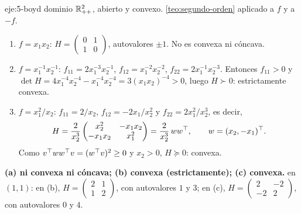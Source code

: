 \begin{solucion}{eje:5-boyd}
\datos dominio $\mathbb{R}^{2}_{++}$, abierto y convexo.
\planteamiento \cref{teo:segundo-orden} aplicado a $f$ y a $-f$.
\pasos
\begin{enumerate}[label=(\alph*)]
  \item $f=x_1x_2$: $H=\begin{pmatrix}0&1\\1&0\end{pmatrix}$, autovalores $\pm1$. No es convexa ni cóncava.
  \item $f=x_1^{-1}x_2^{-1}$: $f_{11}=2x_1^{-3}x_2^{-1}$, $f_{12}=x_1^{-2}x_2^{-2}$, $f_{22}=2x_1^{-1}x_2^{-3}$. Entonces $f_{11}>0$ y $\det H=4x_1^{-4}x_2^{-4}-x_1^{-4}x_2^{-4}=3(x_1x_2)^{-4}>0$, luego $H\succ 0$: estrictamente convexa.
  \item $f=x_1^{2}/x_2$: $f_{11}=2/x_2$, $f_{12}=-2x_1/x_2^{2}$ y $f_{22}=2x_1^{2}/x_2^{3}$, es decir,
  \[H=\frac{2}{x_2^{3}}\begin{pmatrix}x_2^{2}&-x_1x_2\\-x_1x_2&x_1^{2}\end{pmatrix}=\frac{2}{x_2^{3}}\,ww^{\top},\qquad w=(x_2,-x_1)^{\top}.\] Como $v^{\top} ww^{\top} v=(w^{\top} v)^{2}\ge 0$ y $x_2>0$, $H\succeq 0$: convexa.
\end{enumerate}
\resultado \textbf{(a) ni convexa ni cóncava; (b) convexa (estrictamente); (c) convexa.}
\comprobacion en $(1,1)$: en (b), $H=\begin{pmatrix}2&1\\1&2\end{pmatrix}$, con autovalores $1$ y $3$; en (c), $H=\begin{pmatrix}2&-2\\-2&2\end{pmatrix}$, con autovalores $0$ y $4$.
\end{solucion}

